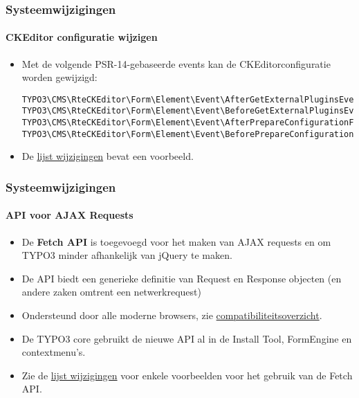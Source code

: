 
\begin{frame}[fragile]
	\frametitle{Systeemwijzigingen}
	\framesubtitle{CKEditor configuratie wijzigen}

	\lstset{basicstyle=\tiny\ttfamily}

	\begin{itemize}
		\item Met de volgende PSR-14-gebaseerde events kan de CKEditorconfiguratie worden gewijzigd:
\begin{lstlisting}
TYPO3\CMS\RteCKEditor\Form\Element\Event\AfterGetExternalPluginsEvent
TYPO3\CMS\RteCKEditor\Form\Element\Event\BeforeGetExternalPluginsEvent
TYPO3\CMS\RteCKEditor\Form\Element\Event\AfterPrepareConfigurationForEditorEvent
TYPO3\CMS\RteCKEditor\Form\Element\Event\BeforePrepareConfigurationForEditorEvent
\end{lstlisting}

		\item De
			\href{https://docs.typo3.org/c/typo3/cms-core/master/en-us/Changelog/10.3/Feature-88818-IntroduceEventsToModifyCKEditorConfiguration.html}{lijst wijzigingen}
			bevat een voorbeeld.
	\end{itemize}

\end{frame}


\begin{frame}[fragile]
	\frametitle{Systeemwijzigingen}
	\framesubtitle{API voor AJAX Requests}

	\lstset{basicstyle=\tiny\ttfamily}

	\begin{itemize}
		\item De \textbf{Fetch API} is toegevoegd voor het maken van AJAX requests
			en om TYPO3 minder afhankelijk van jQuery te maken.
		\item De API biedt een generieke definitie van Request en Response objecten
			(en andere zaken omtrent een netwerkrequest)
		\item Ondersteund door alle moderne browsers, zie
			\href{https://developer.mozilla.org/en-US/docs/Web/API/Fetch_API}{compatibiliteitsoverzicht}.
		\item De TYPO3 core gebruikt de nieuwe API al in de Install Tool, FormEngine en
			contextmenu's.
		\item Zie de
			\href{https://docs.typo3.org/c/typo3/cms-core/master/en-us/Changelog/10.3/Feature-89738-ApiForAjaxRequests.html}{lijst wijzigingen}
			voor enkele voorbeelden voor het gebruik van de Fetch API.

	\end{itemize}

\end{frame}


